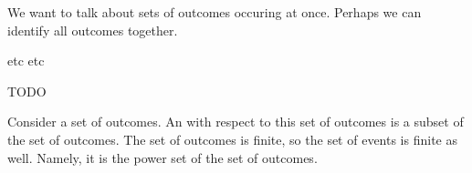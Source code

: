 

We want to talk about sets
of outcomes occuring at once.
Perhaps we can identify all outcomes together.

etc etc

TODO


Consider a set of outcomes.
An  with respect
to this set of outcomes is a
subset of the set of outcomes.
The set of outcomes is finite,
so the set of events is
finite as well. Namely, it
is the power set of the set
of outcomes.

